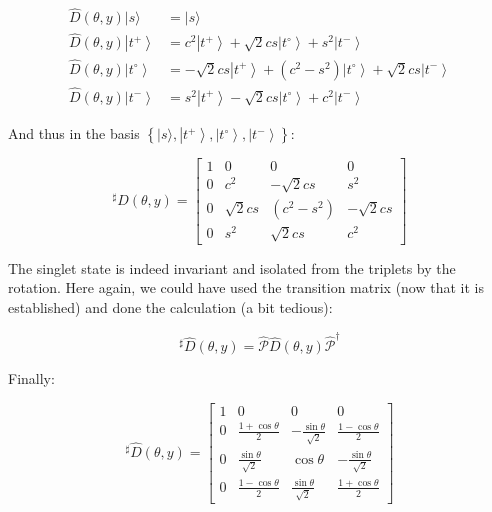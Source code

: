 \documentclass{article}
\begin{document}
\begin{enumerate}
\begin{enumerate}
{            \[
            \begin{aligned}
            \hat{D}(\theta, y) |s\rangle & = |s\rangle \\
            \hat{D}(\theta, y) \left|t^{+}\right\rangle & = c^{2} \left|t^{+}\right\rangle + \sqrt{2} c s \left|t^{\circ}\right\rangle + s^{2} \left|t^{-}\right\rangle \\
            \hat{D}(\theta, y) \left|t^{\circ}\right\rangle & = -\sqrt{2} c s \left|t^{+}\right\rangle + \left(c^{2} - s^{2}\right) \left|t^{\circ}\right\rangle + \sqrt{2} c s \left|t^{-}\right\rangle \\
            \hat{D}(\theta, y) \left|t^{-}\right\rangle & = s^{2} \left|t^{+}\right\rangle - \sqrt{2} c s \left|t^{\circ}\right\rangle + c^{2} \left|t^{-}\right\rangle
            \end{aligned}
            \]

            And thus in the basis \(\left\{|s\rangle, \left|t^{+}\right\rangle, \left|t^{\circ}\right\rangle, \left|t^{-}\right\rangle\right\}\):

            \[
            { }^{\sharp} \hat{D}(\theta, y) = \left[\begin{array}{cccc}
            1 & 0 & 0 & 0 \\
            0 & c^{2} & -\sqrt{2} c s & s^{2} \\
            0 & \sqrt{2} c s & \left(c^{2} - s^{2}\right) & -\sqrt{2} c s \\
            0 & s^{2} & \sqrt{2} c s & c^{2}
            \end{array}\right]
            \]

            The singlet state is indeed invariant and isolated from the triplets by the rotation. Here again, we could have used the transition matrix (now that it is established) and done the calculation (a bit tedious):

            \[
            { }^{\sharp} \hat{D}(\theta, y) = \hat{\mathcal{P}} \hat{D}(\theta, y) \hat{\mathcal{P}}^{\dagger}
            \]

            Finally:

            \[
            { }^{\sharp} \hat{D}(\theta, y) = \left[\begin{array}{cccc}
            1 & 0 & 0 & 0 \\
            0 & \frac{1 + \cos \theta}{2} & -\frac{\sin \theta}{\sqrt{2}} & \frac{1 - \cos \theta}{2} \\
            0 & \frac{\sin \theta}{\sqrt{2}} & \cos \theta & -\frac{\sin \theta}{\sqrt{2}} \\
            0 & \frac{1 - \cos \theta}{2} & \frac{\sin \theta}{\sqrt{2}} & \frac{1 + \cos \theta}{2}
            \end{array}\right]
            \]}


\end{enumerate}
\end{enumerate}
\end{document}
